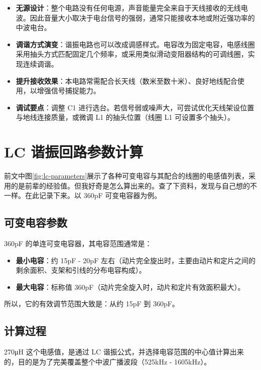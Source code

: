 \documentclass[12pt,UTF8]{ctexbook}
\begin{document}
\begin{itemize}[leftmargin=2cm]
	\item \textbf{无源设计}：整个电路没有任何电源，声音能量完全来自于天线接收的无线电波。因此音量大小取决于电台信号的强弱，通常只能接收本地或附近强功率的中波电台。
	\item \textbf{调谐方式演变}：谐振电路也可以改成调感样式。电容改为固定电容，电感线圈采用抽头方式匹配固定几个频率，或采用类似滑动变阻器结构的可调线圈，实现连续调谐。
	\item \textbf{提升接收效果}：本电路常需配合长天线（数米至数十米）、良好地线配合使用，以增强信号捕捉能力。
	\item \textbf{调试要点}：调整 C1 进行选台。若信号弱或噪声大，可尝试优化天线架设位置与地线连接质量，或微调 L1 的抽头位置（线圈 L1 可设置多个抽头）。
\end{itemize}


\chapter{LC 谐振回路参数计算}
\label{chap:lc-calculation}

前文中图\ref{fig:lc-parameters}展示了各种可变电容与其配合的线圈的电感值列表，采用的是前辈的经验值。但我好奇是怎么算出来的。查了下资料，发现与自己想的不一样。在此记录下来。以 360pF 可变电容器为例。

\section{可变电容参数}

360pF 的单连可变电容器，其电容范围通常是：

\begin{itemize}[leftmargin=2cm]
	\item \textbf{最小电容}：约 15pF - 20pF 左右（动片完全旋出时，主要由动片和定片之间的剩余面积、支架和引线的分布电容构成）。
	\item \textbf{最大电容}：标称值 360pF（动片完全旋入时，动片和定片有效面积最大）。
\end{itemize}

所以，它的有效调节范围大致是：从约 15pF 到 360pF。

\section{计算过程}

270μH 这个电感值，是通过 LC 谐振公式，并选择电容范围的中心值计算出来的，目的是为了完美覆盖整个中波广播波段（525kHz - 1605kHz）。
\end{document}
